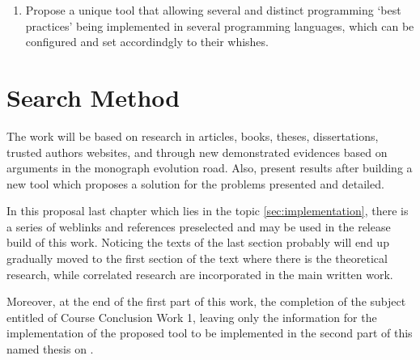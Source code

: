 {\begin{enumerate}
        \item Propose a unique tool that allowing several and distinct programming `best practices'
        being implemented in several programming languages, which can be configured and set
        accordindgly to their whishes.
    \end{enumerate}

    \section{Search Method}

    The work will be based on research in articles, books, theses, dissertations, trusted authors
    websites, and through new demonstrated evidences based on arguments in the monograph evolution
    road. Also, present results after building a new tool which proposes a solution for the problems
    presented and detailed.

    In this proposal last chapter which lies in the topic \autoref{sec:implementation}, there is a
    series of weblinks and references preselected and may be used in the release build of this work.
    Noticing the texts of the last section probably will end up gradually moved to the first section
    of the text where there is the theoretical research, while correlated research are incorporated
    in the main written work.

    Moreover, at the end of the first part of this work, the completion of the subject entitled of
    Course Conclusion Work 1, leaving only the information for the implementation of the proposed
    tool to be implemented in the second part of this named thesis on .
}
